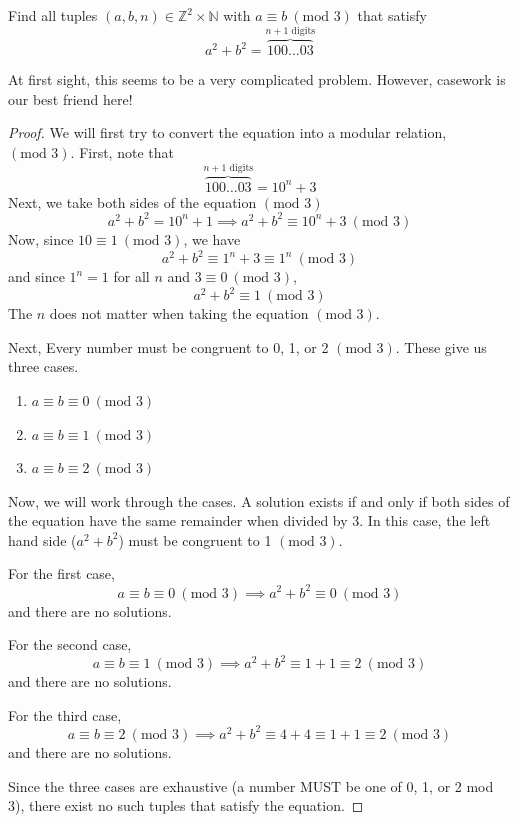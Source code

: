\begin{example}
Find all tuples $(a, b, n) \in \mathbb{Z}^2 \times \mathbb{N}$ with $a \equiv b ~(\text{mod } 3)$ that satisfy
\[
a^2 + b^2 = \overbrace{100\ldots03}^{n+1 \text{ digits}}
\]
\end{example}
At first sight, this seems to be a very complicated problem. However, casework is our best friend here!
\begin{proof}
We will first try to convert the equation into a modular relation, $(\text{mod }3)$. First, note that 
\[
\overbrace{100\ldots03}^{n+1 \text{ digits}} = 10^n + 3 
\]
Next, we take both sides of the equation $(\text{mod }3)$
\[
a^2 + b^2 = 10^n + 1 \implies a^2 + b^2 \equiv 10^n + 3 ~ (\text{mod }3)
\]
Now, since $10 \equiv 1~  (\text{mod }3)$, we have 
\[
a^2 + b^2 \equiv 1^n + 3  \equiv 1^n ~ (\text{mod }3)
\]
and since $1^n = 1$ for all $n$ and $3 \equiv 0 ~ (\text{mod }3)$,
\[
a^2 + b^2 \equiv 1 ~ (\text{mod }3)
\]
The $n$ does not matter when taking the equation $(\text{mod }3)$. 

Next, Every number must be congruent to 0, 1, or 2 $(\text{mod }3)$. These give us three cases. 
\begin{enumerate}
\item $a \equiv b \equiv 0 ~ (\text{mod }3)$
\item $a \equiv b \equiv 1 ~ (\text{mod }3)$
\item $a \equiv b \equiv 2 ~ (\text{mod }3)$
\end{enumerate}
Now, we will work through the cases. A solution exists if and only if both sides of the equation have the same remainder when divided by 3. In this case, the left hand side ($a^2 + b^2$) must be congruent to 1 $(\text{mod }3)$. 

\noindent For the first case,
\[a \equiv b \equiv 0 ~ (\text{mod }3) \implies a^2 + b^2 \equiv 0 ~ (\text{mod }3)\]
and there are no solutions.

\noindent For the second case,
\[a \equiv b \equiv 1 ~ (\text{mod }3) \implies a^2 + b^2 \equiv 1 + 1 \equiv 2 ~ (\text{mod }3)\]
and there are no solutions.

\noindent For the third case,
\[a \equiv b \equiv 2 ~ (\text{mod }3) \implies a^2 + b^2 \equiv 4 + 4 \equiv 1 + 1 \equiv 2 ~ (\text{mod }3)\]
and there are no solutions.

Since the three cases are exhaustive (a number MUST be one of 0, 1, or 2 mod 3), there exist no such tuples that satisfy the equation.
\end{proof}

